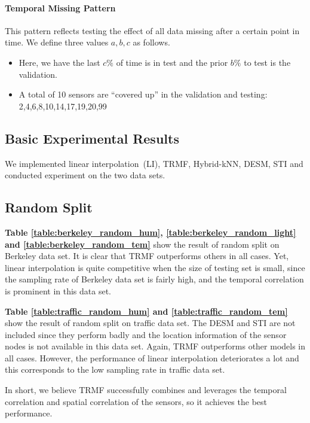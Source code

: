 \paragraph*{Temporal Missing Pattern}

This pattern reflects testing the effect of all data missing after a certain point in time.
We define three values $a, b, c$ as follows.

\begin{itemize}
\item Here, we have the last $c\%$ of time is in test and the prior $b\%$ to test is the validation.
\item A total of 10 sensors are ``covered up'' in the validation and testing: 2,4,6,8,10,14,17,19,20,99
\end{itemize}

\subsection{Basic Experimental Results} %

We implemented linear interpolation~(LI), TRMF, Hybrid-kNN, DESM, STI and conducted experiment on the two data sets.

\subsection{Random Split}
\textbf{Table \ref{table:berkeley_random_hum}, \ref{table:berkeley_random_light} and \ref{table:berkeley_random_tem}} show the result of random split on Berkeley data set. It is clear that TRMF outperforms others in all cases. Yet, linear interpolation is quite competitive when the size of testing set is small, since the sampling rate of Berkeley data set is fairly high, and the temporal correlation is prominent in this data set.  

\textbf{Table \ref{table:traffic_random_hum} and \ref{table:traffic_random_tem}} show the result of random split on traffic data set. The DESM and STI are not included since they perform badly and the location information of the sensor nodes is not available in this data set. Again, TRMF outperforms other models in all cases. However, the performance of linear interpolation deteriorates a lot and this corresponds to the low sampling rate in traffic data set. 

In short, we believe TRMF successfully combines and leverages the temporal correlation and spatial correlation of the sensors, so it achieves the best performance. %

